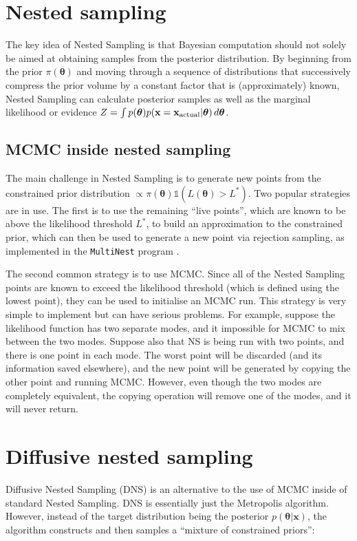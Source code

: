 \documentclass[
  ,final            %
  ]
  {aipproc}
\newcommand{\pars}{\boldsymbol{\theta}}
\newcommand{\data}{\mathbf{x}}
\begin{document}
\section{Nested sampling}
The key idea of Nested Sampling \citep{skilling} is that Bayesian computation
should not solely be aimed at obtaining samples from the posterior distribution.
By beginning from the prior $\pi(\pars)$ and moving through a sequence of
distributions that successively compress the prior volume by a constant factor
that is (approximately) known, Nested Sampling can calculate posterior samples
as well as the marginal likelihood or evidence
$Z = \int p(\pars)p(\data = \data_{\rm actual} | \pars) \, d\pars$.


\subsection{MCMC inside nested sampling}
The main challenge in Nested Sampling is to generate new points from the
constrained prior distribution $\propto \pi(\pars)\mathds{1}(L(\pars) > L^*)$.
Two popular strategies are in use. The first is to use the remaining ``live
points'', which are known to be above the likelihood threshold $L^*$, to build
an approximation to the constrained prior, which can then be used to generate
a new point via rejection sampling, as implemented in the
{\tt MultiNest} program \citep{multinest}.

The second common strategy is to use MCMC. Since all of the Nested Sampling
points are
known to exceed the likelihood threshold (which is defined using the lowest
point), they can be used to initialise an
MCMC run. This strategy is very simple to implement but can have
serious problems. For example,
suppose the likelihood function has two separate modes, and it impossible for
MCMC to mix between the two modes. Suppose also that NS is being run with two
points, and there is one point in each mode. The worst point will be discarded
(and its information saved elsewhere), and the new point will be generated by
copying the other point and running MCMC. However, even though the two modes
are completely equivalent, the copying operation will remove one of the modes,
and it will never return.

\section{Diffusive nested sampling}
Diffusive Nested Sampling (DNS) is an alternative to the use of MCMC inside of
standard Nested Sampling. DNS is essentially just the Metropolis algorithm.
However, instead of the
target distribution being the posterior $p(\pars|\data)$, the algorithm
constructs and then samples a ``mixture of constrained priors'':
\end{document}
